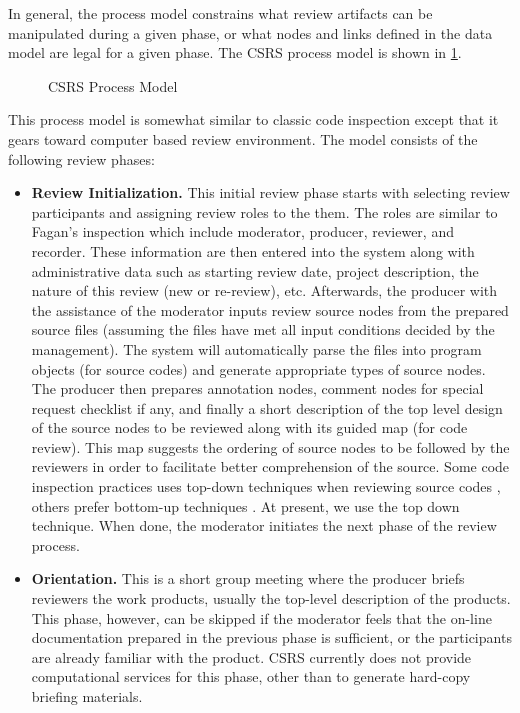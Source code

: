 In general, the process model constrains what review artifacts can be
manipulated during a given phase, or what nodes and links defined in
the data model are legal for a given phase.
The CSRS process model is shown in \ref{fig:process-model}. 

\begin{figure}[htb]
  \caption{CSRS Process Model}
  \label{fig:process-model}
\end{figure}


This process model is 
somewhat similar to classic code inspection except that it gears toward
computer based review environment. The model consists of the
following review phases:

\begin {itemize}
\item {\bf Review Initialization.}
This initial review phase starts with selecting review participants
and assigning review roles to the them.
The roles are similar to Fagan's inspection which
include moderator, producer, reviewer, and recorder. 
These information are then entered into the system along with
administrative data such as starting review date, project description,
the nature of this review (new or re-review), etc.
Afterwards, the producer with the assistance of the moderator inputs
review source nodes from the prepared source files (assuming the files
have met all input conditions decided by the management). The system
will automatically parse the files into program objects (for source
codes) and generate appropriate types of source nodes. The producer
then prepares annotation nodes, comment nodes for special request
checklist if any, and finally  a short description of the top level
design of the source 
nodes to be reviewed along with its guided map (for code review). This
map suggests the ordering of source nodes to be followed by the reviewers 
in order to facilitate better comprehension of the source. 
Some code inspection practices uses top-down techniques
when reviewing source codes \cite{Hart82}, others prefer bottom-up
techniques \cite{Linger79}. At present, we use the top down technique.
When done, the moderator initiates the next phase of the review process.

\item {\bf Orientation.}  This is a short group meeting where the
producer briefs  reviewers the work products, usually the top-level
description of the products. This phase, however, can be skipped if the
moderator feels that the on-line documentation prepared in the
previous phase is sufficient, or the participants are already familiar
with the product. CSRS currently does not provide computational
services for this phase, other than to generate hard-copy briefing
materials.


\end{itemize}
